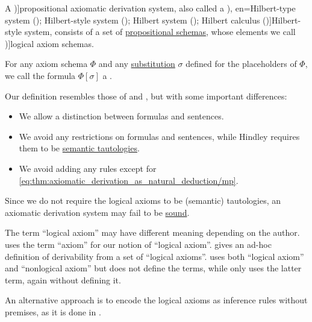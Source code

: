 \begin{definition}\label{def:axiomatic_derivation_system}\mimprovised
  A \term[en=axiomatic system (\cite[6D1]{Hindley1997})]{propositional axiomatic derivation system}, also called a \term[ru=исчисление высказываний гильбертовского типа (\cite[35]{Герасимов2011}), en=Hilbert-type system (\cite[80]{Smullyan1995}); Hilbert-style system (\cite[6D1]{Hindley1997}); Hilbert system (\cite[33]{TroelstraSchwichtenberg2000}); Hilbert calculus (\cite[103]{Mimram2020})]{Hilbert-style system}, consists of a set of \hyperref[def:propositional_formula_schema]{propositional schemas}, whose elements we call \term[en=axiom schema (\cite[80]{Smullyan1995})]{logical axiom schemas}.

  For any axiom schema \( \Phi \) and any \hyperref[def:propositional_schema_substitution]{substitution} \( \sigma \) defined for the placeholders of \( \Phi \), we call the formula \( \Phi[\sigma] \) a .
\end{definition}
\begin{comments}
  \item Our definition resembles those of  and , but with some important differences:
  \begin{itemize}
    \item We allow a distinction between formulas and sentences.
    \item We avoid any restrictions on formulas and sentences, while Hindley requires them to be \hyperref[def:propositional_tautology]{semantic tautologies}.
    \item We avoid adding any rules except for \eqref{eq:thm:axiomatic_derivation_as_natural_deduction/mp}.
  \end{itemize}

  \item Since we do not require the logical axioms to be (semantic) tautologies, an axiomatic derivation system may fail to be \hyperref[def:logical_framework/soundness]{sound}.

  \item The term \enquote{logical axiom} may have different meaning depending on the author.  uses the term \enquote{axiom} for our notion of \enquote{logical axiom}.  gives an ad-hoc definition of derivability from a set of \enquote{logical axioms}.  uses both \enquote{logical axiom} and \enquote{nonlogical axiom} but does not define the terms, while  only uses the latter term, again without defining it.

  \item An alternative approach is to encode the logical axioms as inference rules without premises, as it is done in \cite[103]{Mimram2020}.
\end{comments}


